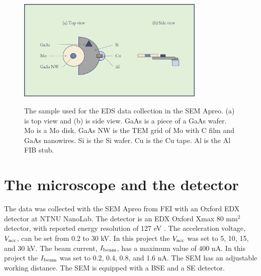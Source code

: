 \begin{figure}[ht]
    \centering
    \colorbox{white}{\includegraphics[width=0.8\textwidth]{figures/Materials-sample1.png}}
    \caption{
        The sample used for the EDS data collection in the SEM Apreo.
        (a) is top view and (b) is side view.
        GaAs is a piece of a GaAs wafer.
        Mo is a Mo disk.
        GaAs NW is the TEM grid of Mo with C film and GaAs nanowires.
        Si is the Si wafer.
        Cu is the Cu tape.
        Al is the Al FIB stub.
    }
    \label{fig:method:materials:sample1}
\end{figure}



%
%
\section{The microscope and the detector}
\label{sec:method:detector}
The data was collected with the SEM Apreo from FEI with an Oxford EDX detector at NTNU NanoLab.
The detector is an EDX Oxford Xmax 80 mm$^2$ detector, with reported energy resolution of 127 eV \cite{oxford_xmax_80}.
The acceleration voltage, $V_\textnormal{acc}$, can be set from 0.2 to 30 kV.
In this project the $V_\textnormal{acc}$ was set to 5, 10, 15, and 30 kV.
The beam current, $I_\textnormal{beam}$, has a maximum value of 400 nA.
In this project the $I_\textnormal{beam}$ was set to 0.2, 0.4, 0.8, and 1.6 nA.
The SEM has an adjustable working distance.
The SEM is equipped with a BSE and a SE detector.

